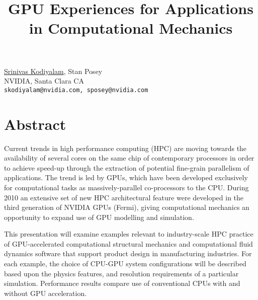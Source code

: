 \title{GPU Experiences for Applications in Computational Mechanics}
\author{} \institute{}
\maketitle

\begin{center}
{\large \underline{Srinivas Kodiyalam}, Stan Posey}\\
NVIDIA, Santa Clara CA\\
{\tt skodiyalam@nvidia.com, sposey@nvidia.com}
\end{center}

\section*{Abstract}
Current trends in high performance computing (HPC) are moving towards the availability of several cores on the same chip of contemporary processors in order to achieve speed-up through the extraction of potential fine-grain parallelism of applications. The trend is led by GPUs, which have been developed exclusively for computational tasks as massively-parallel co-processors to the CPU. During 2010 an extensive set of new HPC architectural feature were developed in the third generation of NVIDIA GPUs (Fermi), giving computational mechanics an opportunity to expand use of GPU modelling and simulation.

This presentation will examine examples relevant to industry-scale HPC practice of GPU-accelerated computational structural mechanics and computational fluid dynamics software that support product design in manufacturing industries. For each example, the choice of CPU-GPU system configurations will be described based upon the physics features, and resolution requirements of a particular simulation. Performance results compare use of conventional CPUs with and without GPU acceleration.

